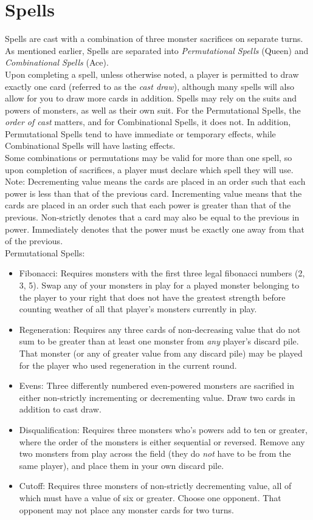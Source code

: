 \documentclass[letterpaper, reqno, 11pt]{article}
\begin{document}
\section*{Spells}
\indent Spells are cast with a combination of three monster sacrifices on separate turns. As mentioned earlier, Spells are separated into \textit{Permutational Spells} (Queen) and \textit{Combinational Spells} (Ace).\\
Upon completing a spell, unless otherwise noted, a player is permitted to draw exactly one card (referred to as the \textit{cast draw}), although many spells will also allow for you to draw more cards in addition. Spells may rely on the suits and powers of monsters, as well as their own suit.
\indent For the Permutational Spells, the \textit{order of cast} matters, and for Combinational Spells, it does not. In addition, Permutational Spells tend to have immediate or temporary effects, while Combinational Spells will have lasting effects.\\
Some combinations or permutations may be valid for more than one spell, so upon completion of sacrifices, a player must declare which spell they will use.\\
\indent Note: Decrementing value means the cards are placed in an order such that each power is less than that of the previous card. Incrementing value means that the cards are placed in an order such that each power is greater than that of the previous. Non-strictly denotes that a card may also be equal to the previous in power. Immediately denotes that the power must be exactly one away from that of the previous.\\
Permutational Spells:
\begin{itemize}
\item Fibonacci: Requires monsters with the first three legal fibonacci numbers (2, 3, 5). Swap any of your monsters in play for a played monster belonging to the player to your right that does not have the greatest strength before counting weather of all that player's monsters currently in play.
\item Regeneration: Requires any three cards of non-decreasing value that do not sum to be greater than at least one monster from \textit{any} player's discard pile. That monster (or any of greater value from any discard pile) may be played for the player who used regeneration in the current round.
\item Evens: Three differently numbered even-powered monsters are sacrified in either non-strictly incrementing or decrementing value. Draw two cards in addition to cast draw.
\item Disqualification: Requires three monsters who's powers add to ten or greater, where the order of the monsters is either sequential or reversed. Remove any two monsters from play across the field (they do \textit{not} have to be from the same player), and place them in your own discard pile.
\item Cutoff: Requires three monsters of non-strictly decrementing value, all of which must have a value of six or greater. Choose one opponent. That opponent may not place any monster cards for two turns.
\end{itemize}
\end{document}
